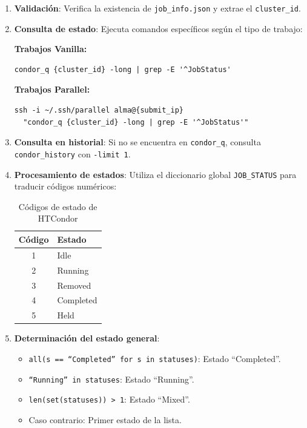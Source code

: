 \begin{enumerate}
	\item \textbf{Validación}: Verifica la existencia de \texttt{job\_info.json} y extrae el \texttt{cluster\_id}.

	\item \textbf{Consulta de estado}: Ejecuta comandos específicos según el tipo de trabajo:

	      \textbf{Trabajos Vanilla:}
	      \begin{verbatim}
condor_q {cluster_id} -long | grep -E '^JobStatus'
	      \end{verbatim}

	      \textbf{Trabajos Parallel:}
	      \begin{verbatim}
ssh -i ~/.ssh/parallel alma@{submit_ip} 
  "condor_q {cluster_id} -long | grep -E '^JobStatus'"
	      \end{verbatim}

	\item \textbf{Consulta en historial}: Si no se encuentra en \texttt{condor\_q}, consulta \texttt{condor\_history} con \texttt{-limit 1}.

	\item \textbf{Procesamiento de estados}: Utiliza el diccionario global \texttt{JOB\_STATUS} para traducir códigos numéricos:

	      \begin{table}[H]
		      \centering
		      \begin{tabular}{|c|l|}
			      \hline
			      \textbf{Código} & \textbf{Estado}        \\
			      \hline
			      1               & Idle                   \\
			      2               & Running                \\
			      3               & Removed                \\
			      4               & Completed              \\
			      5               & Held                   \\
			      \hline
		      \end{tabular}
		      \caption{Códigos de estado de HTCondor}
		      \label{tab:job-status-codes}
	      \end{table}

	\item \textbf{Determinación del estado general}:
	      \begin{itemize}
		      \item \texttt{all(s == ``Completed'' for s in statuses)}: Estado ``Completed''.
		      \item \texttt{``Running'' in statuses}: Estado ``Running''.
		      \item \texttt{len(set(statuses)) > 1}: Estado ``Mixed''.
		      \item Caso contrario: Primer estado de la lista.
	      \end{itemize}
\end{enumerate}


